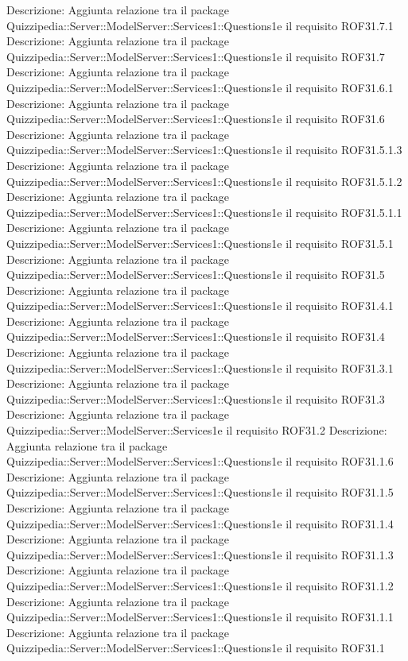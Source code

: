 Descrizione: Aggiunta relazione tra il package Quizzipedia::Server::ModelServer::Services1::Questions1e il requisito ROF31.7.1 
Descrizione: Aggiunta relazione tra il package Quizzipedia::Server::ModelServer::Services1::Questions1e il requisito ROF31.7 
Descrizione: Aggiunta relazione tra il package Quizzipedia::Server::ModelServer::Services1::Questions1e il requisito ROF31.6.1 
Descrizione: Aggiunta relazione tra il package Quizzipedia::Server::ModelServer::Services1::Questions1e il requisito ROF31.6 
Descrizione: Aggiunta relazione tra il package Quizzipedia::Server::ModelServer::Services1::Questions1e il requisito ROF31.5.1.3 
Descrizione: Aggiunta relazione tra il package Quizzipedia::Server::ModelServer::Services1::Questions1e il requisito ROF31.5.1.2 
Descrizione: Aggiunta relazione tra il package Quizzipedia::Server::ModelServer::Services1::Questions1e il requisito ROF31.5.1.1 
Descrizione: Aggiunta relazione tra il package Quizzipedia::Server::ModelServer::Services1::Questions1e il requisito ROF31.5.1 
Descrizione: Aggiunta relazione tra il package Quizzipedia::Server::ModelServer::Services1::Questions1e il requisito ROF31.5 
Descrizione: Aggiunta relazione tra il package Quizzipedia::Server::ModelServer::Services1::Questions1e il requisito ROF31.4.1 
Descrizione: Aggiunta relazione tra il package Quizzipedia::Server::ModelServer::Services1::Questions1e il requisito ROF31.4 
Descrizione: Aggiunta relazione tra il package Quizzipedia::Server::ModelServer::Services1::Questions1e il requisito ROF31.3.1 
Descrizione: Aggiunta relazione tra il package Quizzipedia::Server::ModelServer::Services1::Questions1e il requisito ROF31.3 
Descrizione: Aggiunta relazione tra il package Quizzipedia::Server::ModelServer::Services1e il requisito ROF31.2 
Descrizione: Aggiunta relazione tra il package Quizzipedia::Server::ModelServer::Services1::Questions1e il requisito ROF31.1.6 
Descrizione: Aggiunta relazione tra il package Quizzipedia::Server::ModelServer::Services1::Questions1e il requisito ROF31.1.5 
Descrizione: Aggiunta relazione tra il package Quizzipedia::Server::ModelServer::Services1::Questions1e il requisito ROF31.1.4 
Descrizione: Aggiunta relazione tra il package Quizzipedia::Server::ModelServer::Services1::Questions1e il requisito ROF31.1.3 
Descrizione: Aggiunta relazione tra il package Quizzipedia::Server::ModelServer::Services1::Questions1e il requisito ROF31.1.2 
Descrizione: Aggiunta relazione tra il package Quizzipedia::Server::ModelServer::Services1::Questions1e il requisito ROF31.1.1 
Descrizione: Aggiunta relazione tra il package Quizzipedia::Server::ModelServer::Services1::Questions1e il requisito ROF31.1 
